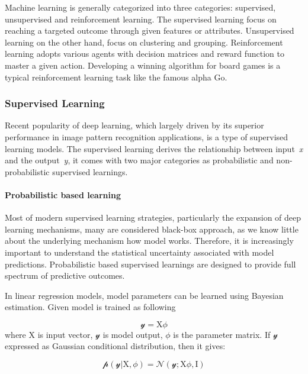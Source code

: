 Machine learning is generally categorized into three categories: supervised, unsupervised and reinforcement learning. The supervised learning focus on reaching a targeted outcome through given features or attributes. Unsupervised learning on the other hand, focus on clustering and grouping. Reinforcement learning adopts various agents with decision matrices and reward function to master a given action. Developing a winning algorithm for board games is a typical reinforcement learning task like the famous alpha Go.
\par

\subsubsection{Supervised Learning}

Recent popularity of deep learning, which largely driven by its superior performance in image pattern recognition applications, is a type of supervised learning models. The supervised learning  derives the relationship between input~\textit{x} and the output~\textit{y}, it comes with two major categories as probabilistic and non-probabilistic supervised learnings. 

\paragraph{Probabilistic based learning}
Most of modern supervised learning strategies, particularly the expansion of deep learning mechanisms, many are considered black-box approach, as we know little about the underlying mechanism how model works. Therefore, it is increasingly important to understand the statistical uncertainty associated with model predictions. Probabilistic based supervised learnings are designed to provide full spectrum of predictive outcomes. 
\par 

In linear regression models, model parameters can be learned using Bayesian estimation. Given model is trained as following

\begin{equation}
    \mathcal{y} = \mathrm{X}\mathcal{\phi}
\end{equation}
where $\mathrm{X}$ is input vector, $\mathcal{y}$ is model output, $\mathcal{\phi}$ is the parameter matrix. If $\mathcal{y}$ expressed as Gaussian conditional distribution, then it gives:

\begin{equation}
    \mathcal{p}(\mathcal{y}|\mathrm{X},\mathcal{\phi}) = \mathcal{N}(\mathcal{y};\mathrm{X}\mathcal{\phi},\mathrm{I})
\end{equation}


